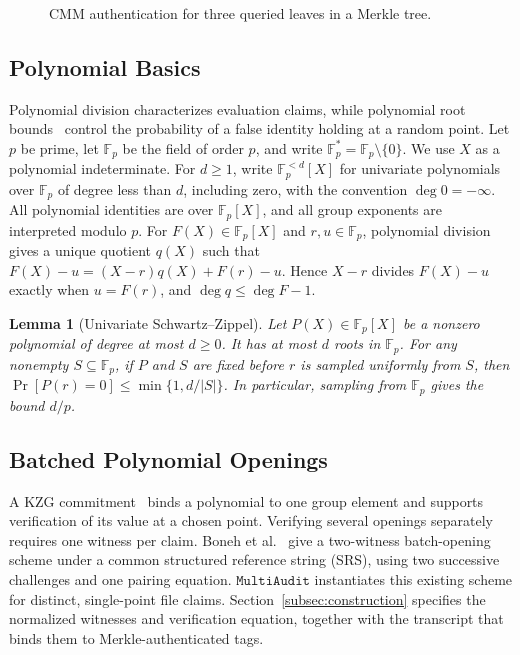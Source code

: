 \documentclass[lettersize,journal]{IEEEtran}
\newtheorem{lemma}{Lemma}
\newcommand{\FF}{\mathbb{F}}
\newcommand{\MultiAudit}{\ensuremath{\mathtt{MultiAudit}}}
\begin{document}
\begin{figure}[!ht]
\caption{CMM authentication for three queried leaves in a Merkle tree.}
\label{fig:cmm_example}
\end{figure}



\subsection{Polynomial Basics}
\label{subsec:polynomial_basics}
Polynomial division characterizes evaluation claims, while polynomial root bounds~\cite{Schwartz1980} control the probability of a false identity holding at a random point. Let $p$ be prime, let $\FF_p$ be the field of order $p$, and write $\FF_p^*=\FF_p\setminus\{0\}$. We use $X$ as a polynomial indeterminate. For $d\geq1$, write $\FF_p^{<d}[X]$ for univariate polynomials over $\FF_p$ of degree less than $d$, including zero, with the convention $\deg0=-\infty$. All polynomial identities are over $\FF_p[X]$, and all group exponents are interpreted modulo $p$.
For $F(X)\in\FF_p[X]$ and $r,u\in\FF_p$, polynomial division gives a unique quotient $q(X)$ such that $F(X)-u=(X-r)q(X)+F(r)-u$. Hence $X-r$ divides $F(X)-u$ exactly when $u=F(r)$, and $\deg q\leq\deg F-1$.

\begin{lemma}[Univariate Schwartz--Zippel]\label{lem:schwartz_zippel}
Let $P(X)\in\FF_p[X]$ be a nonzero polynomial of degree at most $d\geq0$. It has at most $d$ roots in $\FF_p$. For any nonempty $S\subseteq\FF_p$, if $P$ and $S$ are fixed before $r$ is sampled uniformly from $S$, then $\Pr[P(r)=0]\leq\min\{1,d/|S|\}$. In particular, sampling from $\FF_p$ gives the bound $d/p$.
\end{lemma}

\subsection{Batched Polynomial Openings}
\label{subsec:batch_openings}
A KZG commitment~\cite{Kate2010KZG} binds a polynomial to one group element and supports verification of its value at a chosen point. Verifying several openings separately requires one witness per claim. Boneh et al.~\cite[Sec.~4.1]{Boneh2020PCS} give a two-witness batch-opening scheme under a common structured reference string (SRS), using two successive challenges and one pairing equation. \MultiAudit{} instantiates this existing scheme for distinct, single-point file claims. Section~\ref{subsec:construction} specifies the normalized witnesses and verification equation, together with the transcript that binds them to Merkle-authenticated tags.
\end{document}

